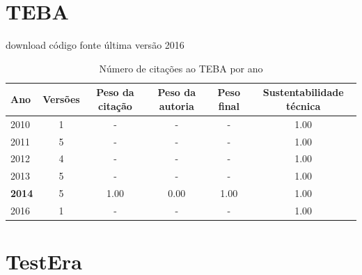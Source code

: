 \section{TEBA}
\checkmark download
\checkmark código fonte
\checkmark última versão 2016


\begin{table}[H]
\caption{Número de citações ao TEBA por ano}
\centering
\begin{tabular}{| l | c | c | c | c | c |}
  \hline
  Ano & Versões & Peso da citação & Peso da autoria & Peso final & Sustentabilidade técnica \\
  \hline
        2010 & 1 & - & - & -
        &
          {\color{blue} 1.00}
        \\
\hline
        2011 & 5 & - & - & -
        &
          {\color{blue} 1.00}
        \\
\hline
        2012 & 4 & - & - & -
        &
          {\color{blue} 1.00}
        \\
\hline
        2013 & 5 & - & - & -
        &
          {\color{blue} 1.00}
        \\
\hline
            {\bf 2014}
          &
          5
          &
          1.00
          &
          0.00
          &
          1.00
          &
            {\color{blue} 1.00}
          \\
\hline
        2016 & 1 & - & - & -
        &
          {\color{blue} 1.00}
        \\
\hline
\end{tabular}
\end{table}



\section{TestEra}


